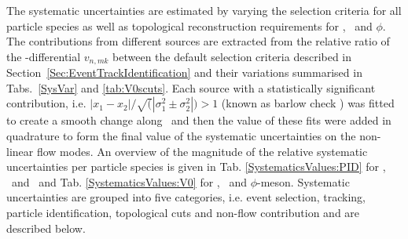 \documentclass[ALICE,manyauthors]{cernphprep}
\begin{document}
The systematic uncertainties are estimated by varying the selection criteria for all particle species as well as topological reconstruction requirements for \Ks, \lambdas~and $\phi$. The contributions from different sources are extracted from the relative ratio of the \pT-differential $v_{n,mk}$ between the default selection criteria described in Section~\ref{Sec:EventTrackIdentification} and their variations summarised in Tabs.~\ref{SysVar} and \ref{tab:V0scuts}. Each source with a statistically significant contribution, i.e. $|x_1 - x_2| / \sqrt(|\sigma_{1}^{2} \pm \sigma_{2}^{2}|)  > 1$ (known as barlow check \cite{Barlow:2002yb}) was fitted to create a smooth change along \pT~and then the value of these fits were added in quadrature to form the final value of the systematic uncertainties on the non-linear flow modes. An overview of the magnitude of the relative systematic uncertainties per particle species is given in Tab. \ref{SystematicsValues:PID} for \pion, \kaon~and \proton~and Tab. \ref{SystematicsValues:V0} for \Ks, \lambdas~and $\phi$-meson. Systematic uncertainties are grouped into five categories, i.e. event selection, tracking, particle identification, topological cuts and non-flow contribution and are described below.
\end{document}
